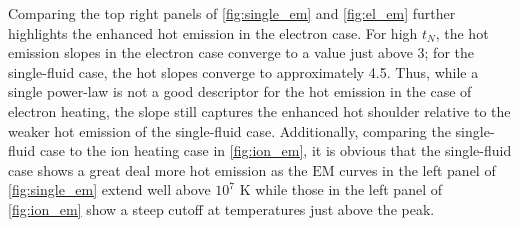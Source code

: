 \documentclass[apj]{emulateapj}
\begin{document}
	\par Comparing the top right panels of \autoref{fig:single_em} and \autoref{fig:el_em} further highlights the enhanced hot emission in the electron case. For high $t_N$, the hot emission slopes in the electron case converge to a value just above 3; for the single-fluid case, the hot slopes converge to approximately 4.5. Thus, while a single power-law is not a good descriptor for the hot emission in the case of electron heating, the slope still captures the enhanced hot shoulder relative to the weaker hot emission of the single-fluid case. Additionally, comparing the single-fluid case to the ion heating case in \autoref{fig:ion_em}, it is obvious that the single-fluid case shows a great deal more hot emission as the $\mathrm{EM}$ curves in the left panel of \autoref{fig:single_em} extend well above $10^7$ K while those in the left panel of \autoref{fig:ion_em} show a steep cutoff at temperatures just above the peak.
\end{document}
